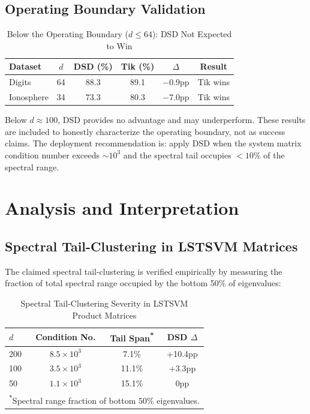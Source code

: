\documentclass[preprint,review,12pt]{elsarticle}
\begin{document}
\subsection{Operating Boundary Validation}

\begin{table}[!t]
\centering
\caption{Below the Operating Boundary ($d \leq 64$): DSD Not Expected to Win}
\label{tab:realworld}
\begin{tabular}{@{}lccccc@{}}
\toprule
\textbf{Dataset} & \textbf{$d$} & \textbf{DSD (\%)} & \textbf{Tik (\%)} & \textbf{$\Delta$} & \textbf{Result} \\
\midrule
Digits & 64 & 88.3 & 89.1 & $-$0.9pp & Tik wins \\
Ionosphere & 34 & 73.3 & 80.3 & $-$7.0pp & Tik wins \\
\bottomrule
\end{tabular}
\end{table}

Below $d \approx 100$, DSD provides no advantage and may underperform. These results are included to honestly characterize the operating boundary, not as success claims. The deployment recommendation is: apply DSD when the system matrix condition number exceeds $\sim 10^3$ and the spectral tail occupies $< 10\%$ of the spectral range.


\section{Analysis and Interpretation}
\label{sec:analysis}

\subsection{Spectral Tail-Clustering in LSTSVM Matrices}

The claimed spectral tail-clustering is verified empirically by measuring the fraction of total spectral range occupied by the bottom 50\% of eigenvalues:

\begin{table}[!t]
\centering
\caption{Spectral Tail-Clustering Severity in LSTSVM Product Matrices}
\label{tab:spectral_analysis}
\begin{tabular}{@{}lccc@{}}
\toprule
\textbf{$d$} & \textbf{Condition No.} & \textbf{Tail Span\textsuperscript{*}} & \textbf{DSD $\Delta$} \\
\midrule
200 & $8.5 \times 10^3$ & 7.1\% & +10.4pp \\
100 & $3.5 \times 10^3$ & 11.1\% & +3.3pp \\
50 & $1.1 \times 10^3$ & 15.1\% & 0pp \\
\bottomrule
\multicolumn{4}{l}{\footnotesize \textsuperscript{*}Spectral range fraction of bottom 50\% eigenvalues.}
\end{tabular}
\end{table}
\end{document}
